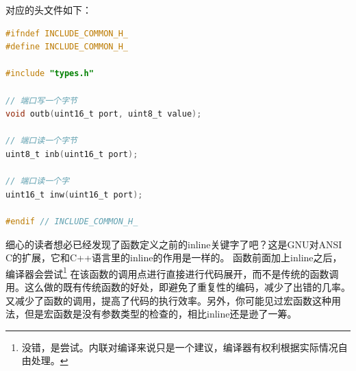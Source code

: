 \par 对应的头文件如下：
\begin{lstlisting}[language = C, label = include/common.h, caption = include/common.h]
#ifndef INCLUDE_COMMON_H_
#define INCLUDE_COMMON_H_

#include "types.h"

// 端口写一个字节
void outb(uint16_t port, uint8_t value);

// 端口读一个字节
uint8_t inb(uint16_t port);

// 端口读一个字
uint16_t inw(uint16_t port);

#endif // INCLUDE_COMMON_H_
\end{lstlisting}

\par 细心的读者想必已经发现了函数定义之前的inline关键字了吧？这是GNU对ANSI C的扩展，它和C++语言里的inline的作用是一样的。\allowbreak
函数前面加上inline之后，编译器会尝试\footnote{没错，是尝试。内联对编译来说只是一个建议，编译器有权利根据实际情况自由处理。}\allowbreak
在该函数的调用点进行直接进行代码展开，而不是传统的函数调用。这么做的既有传统函数的好处，即避免了重复性的编码，减少了出错的几率。\allowbreak
又减少了函数的调用，提高了代码的执行效率。另外，你可能见过宏函数这种用法，但是宏函数是没有参数类型的检查的，相比inline还是逊了一筹。





